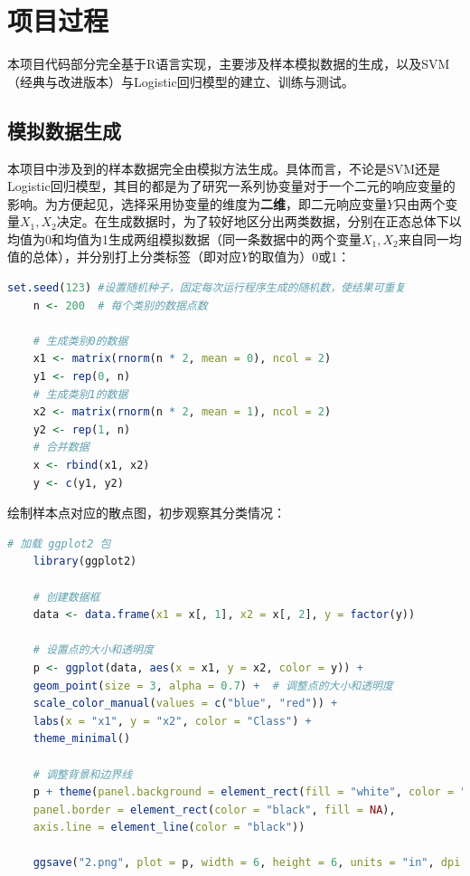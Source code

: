 \documentclass[12pt]{article}  %
\begin{document}
\section{项目过程}
本项目代码部分完全基于R语言实现，主要涉及样本模拟数据的生成，以及SVM（经典与改进版本）与Logistic回归模型的建立、训练与测试。
\subsection{模拟数据生成}
本项目中涉及到的样本数据完全由模拟方法生成。具体而言，不论是SVM还是 Logistic回归模型，其目的都是为了研究一系列协变量对于一个二元的响应变量的影响。为方便起见，选择采用协变量的维度为\textbf{二维}，即二元响应变量$Y$只由两个变量$X_1,X_2$决定。在生成数据时，为了较好地区分出两类数据，分别在正态总体下以均值为0和均值为1生成两组模拟数据（同一条数据中的两个变量$X_1,X_2$来自同一均值的总体），并分别打上分类标签（即对应$Y$的取值为）0或1：

\begin{lstlisting}[language=R]
	set.seed(123) #设置随机种子，固定每次运行程序生成的随机数，使结果可重复
	n <- 200  # 每个类别的数据点数
	
	# 生成类别0的数据
	x1 <- matrix(rnorm(n * 2, mean = 0), ncol = 2)
	y1 <- rep(0, n)
	# 生成类别1的数据
	x2 <- matrix(rnorm(n * 2, mean = 1), ncol = 2)
	y2 <- rep(1, n)
	# 合并数据
	x <- rbind(x1, x2)
	y <- c(y1, y2)
\end{lstlisting} 

绘制样本点对应的散点图，初步观察其分类情况：
\begin{lstlisting}[language=R]
	# 加载 ggplot2 包
	library(ggplot2)
	
	# 创建数据框
	data <- data.frame(x1 = x[, 1], x2 = x[, 2], y = factor(y))
	
	# 设置点的大小和透明度
	p <- ggplot(data, aes(x = x1, y = x2, color = y)) +
	geom_point(size = 3, alpha = 0.7) +  # 调整点的大小和透明度
	scale_color_manual(values = c("blue", "red")) +
	labs(x = "x1", y = "x2", color = "Class") +
	theme_minimal()
	
	# 调整背景和边界线
	p + theme(panel.background = element_rect(fill = "white", color = "black"),
	panel.border = element_rect(color = "black", fill = NA),
	axis.line = element_line(color = "black"))
	
	ggsave("2.png", plot = p, width = 6, height = 6, units = "in", dpi = 300)
\end{lstlisting}
\end{document}
